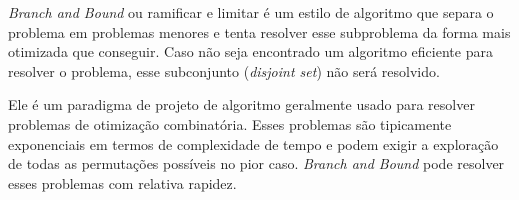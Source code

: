\emph{Branch and Bound} ou ramificar e limitar é um estilo de algoritmo
que separa o problema em problemas menores e tenta resolver esse 
subproblema da forma mais otimizada que conseguir. Caso não
seja encontrado um algoritmo eficiente para resolver o problema, 
esse subconjunto (\emph{disjoint set}) não será resolvido.

Ele é um paradigma de projeto de algoritmo geralmente usado para resolver problemas de otimização combinatória. 
Esses problemas são tipicamente exponenciais em termos de complexidade de tempo e podem exigir a exploração de todas as permutações possíveis no pior caso. 
\emph{Branch and Bound} pode resolver esses problemas com relativa rapidez.